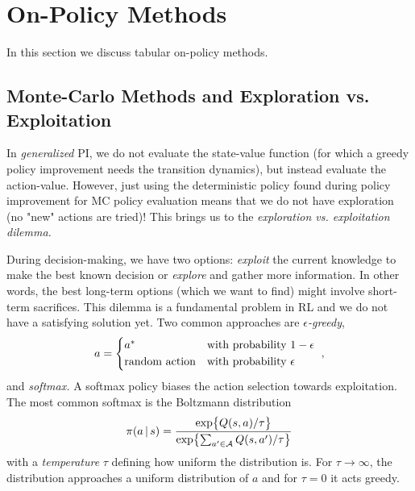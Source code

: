 	\section{On-Policy Methods}
		In this section we discuss tabular on-policy methods.

		\subsection{Monte-Carlo Methods and Exploration vs. Exploitation}
			\label{subsec:mcExploration}

			In \emph{generalized} \ac{PI}, we do not evaluate the state-value function (for which a greedy policy improvement needs the transition dynamics), but instead evaluate the action-value. However, just using the deterministic policy found during policy improvement for \ac{MC} policy evaluation means that we do not have exploration (no "new" actions are tried)! This brings us to the \emph{exploration vs. exploitation dilemma.}

			During decision-making, we have two options: \emph{exploit} the current knowledge to make the best known decision or \emph{explore} and gather more information. In other words, the best long-term options (which we want to find) might involve short-term sacrifices. This dilemma is a fundamental problem in \ac{RL} and we do not have a satisfying solution yet. Two common approaches are \emph{\(\epsilon\)-greedy},
			\begin{align}
				a =
				\begin{cases*}
					a^\ast               & with probability \(1 - \epsilon\) \\
					\text{random action} & with probability \(\epsilon\)
				\end{cases*},
			\end{align}
			and \emph{softmax.} A softmax policy biases the action selection towards exploitation. The most common softmax is the Boltzmann distribution
			\begin{equation}
				\pi(a \,\vert\, s) = \frac{\exp\bigl\{ Q(s, a) / \tau \bigr\}}{\exp\bigl\{ \sum_{a' \in \mathcal{A}} Q(s, a') / \tau \bigr\}}
			\end{equation}
			with a \emph{temperature} \(\tau\) defining how uniform the distribution is. For \(\tau \to \infty\), the distribution approaches a uniform distribution of \(a\) and for \(\tau = 0\) it acts greedy.

